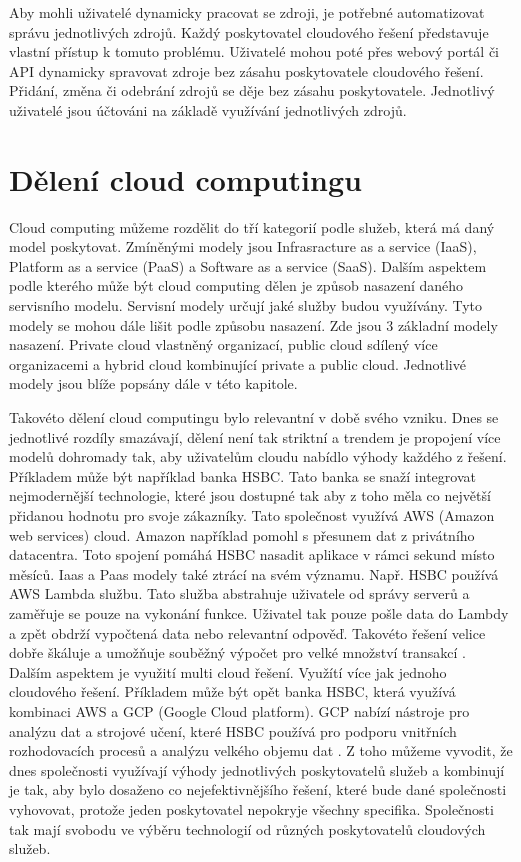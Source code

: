     Aby mohli uživatelé dynamicky pracovat se zdroji, je potřebné automatizovat správu jednotlivých zdrojů. Každý poskytovatel cloudového řešení představuje vlastní přístup k tomuto problému. Uživatelé mohou poté přes webový portál či API dynamicky spravovat zdroje bez zásahu poskytovatele cloudového řešení. Přidání, změna či odebrání zdrojů se děje bez zásahu poskytovatele. Jednotlivý uživatelé jsou účtováni na základě využívání jednotlivých zdrojů. 

\section{Dělení cloud computingu}
    Cloud computing můžeme rozdělit do tří kategorií podle služeb, která má daný model poskytovat. Zmíněnými modely jsou Infrasracture as a service (IaaS), Platform as a service (PaaS) a Software as a service (SaaS). Dalším aspektem podle kterého může být cloud computing dělen je způsob nasazení daného servisního modelu. Servisní modely určují jaké služby budou využívány. Tyto modely se mohou dále lišit podle způsobu nasazení. Zde jsou 3 základní modely nasazení. Private cloud vlastněný organizací, public cloud sdílený více organizacemi a hybrid cloud kombinující private a public cloud. Jednotlivé modely jsou blíže popsány dále v této kapitole. \par
        Takovéto dělení cloud computingu bylo relevantní v době svého vzniku. Dnes se jednotlivé rozdíly smazávají, dělení není tak striktní a trendem je propojení více modelů dohromady tak, aby uživatelům cloudu nabídlo výhody každého z řešení. Příkladem může být například banka HSBC. Tato banka se snaží integrovat nejmodernější technologie, které jsou dostupné tak aby z toho měla co největší přidanou hodnotu pro svoje zákazníky. Tato společnost využívá AWS (Amazon web services) cloud. Amazon například pomohl s přesunem dat z privátního datacentra. Toto spojení pomáhá HSBC nasadit aplikace v rámci sekund místo měsíců. Iaas a Paas modely také ztrácí na svém významu. Např. HSBC používá AWS Lambda službu. Tato služba abstrahuje uživatele od správy serverů a zaměřuje se pouze na vykonání funkce. Uživatel tak pouze pošle data do Lambdy a zpět obdrží vypočtená data nebo relevantní odpověď. Takovéto řešení velice dobře škáluje a umožňuje souběžný výpočet pro velké množství transakcí \cite{devopsonline}. Dalším aspektem je využití multi cloud řešení. Využítí více jak jednoho cloudového řešení. Příkladem může být opět banka HSBC, která využívá kombinaci AWS a GCP (Google Cloud platform). GCP nabízí nástroje pro analýzu dat a strojové učení, které HSBC používá pro podporu vnitřních rozhodovacích procesů a analýzu velkého objemu dat \cite{digitalnewasia}. Z toho můžeme vyvodit, že dnes společnosti využívají výhody jednotlivých poskytovatelů služeb a kombinují je tak, aby bylo dosaženo co nejefektivnějšího řešení, které bude dané společnosti vyhovovat, protože jeden poskytovatel nepokryje všechny specifika. Společnosti tak mají svobodu ve výběru technologií od různých poskytovatelů cloudových služeb.\par
